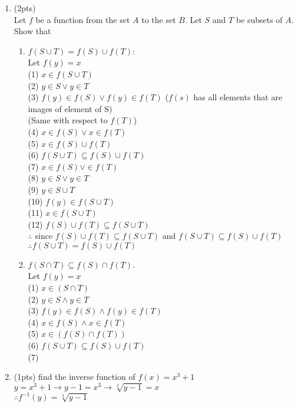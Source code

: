 \documentclass[12pt]{article}
\begin{document}
\begin{enumerate}
\item  (2pts)\\ Let $f$ be a function from the set $A$ to the set $B$. Let $S$ and $T$ be subsets of $A$. Show that
\begin{enumerate}
	\item $f(S \cup T) = f(S) \cup f(T)$:
    \\Let $f(y) = x$
    \\(1) $x \in f(S \cup T)$
    \\(2) $y \in S \lor y \in T$
    \\(3) $f(y) \in f(S) \lor f(y) \in f(T)$ ($f(s)$ has all elements that are images of element of S)
    \\(Same with respect to $f(T)$)
    \\(4) $x \in f(S) \lor x \in f(T)$
    \\(5) $x \in f(S) \cup f(T)$
    \\(6) $f(S \cup T) \subseteq f(S) \cup f(T)$
    \\(7) $x \in f(S) \lor \in f(T)$
    \\(8) $y \in S \lor y \in T$
    \\(9) $y \in S \cup T$
    \\(10) $f(y) \in f(S \cup T)$
    \\(11) $x \in f(S \cup T)$
    \\(12) $f(S) \cup f(T) \subseteq f(S \cup T)$
    \\$\therefore$ since $f(S) \cup f(T) \subseteq f(S \cup T)$ and $f(S \cup T) \subseteq f(S) \cup f(T)$
    \\$\therefore f(S \cup T) = f(S) \cup f(T)$
	\\\item $f(S \cap T) \subseteq f(S) \cap f(T)$.
    \\Let $f(y) = x$
    \\(1) $x \in (S \cap T)$
    \\(2) $y \in S \land y \in T$
    \\(3) $f(y) \in f(S) \land f(y) \in f(T)$
    \\(4) $x \in f(S) \land x \in f(T)$
    \\(5) $x \in (f(S) \cap f(T))$
    \\(6) $f(S \cup T) \subseteq f(S) \cup f(T)$
    \\(7)
\end{enumerate}

\item  (1pts) find the inverse function of $f(x)=x^3+1$
\\$y = x^3 + 1 \rightarrow y - 1 = x^3 \rightarrow \sqrt[3]{y - 1} = x$
\\$\therefore f^{-1} (y) = \sqrt[3]{y - 1}$


\end{enumerate}
\end{document}

